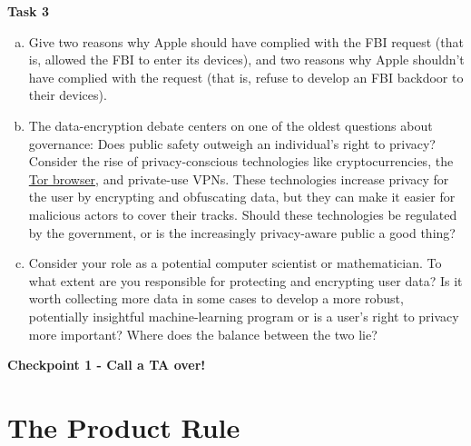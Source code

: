 \documentclass[12pt,letterpaper]{article}
\begin{document}
    \textbf{Task 3}
    \begin{enumerate}[a.]
    \item Give two reasons why Apple should have complied with the FBI request (that is, allowed the FBI to enter its devices), and two reasons why Apple shouldn't have complied with the request (that is, refuse to develop an FBI backdoor to their devices). 
    
    \begin{mdframed} \vspace{4cm} \end{mdframed}
    
    \item The data-encryption debate centers on one of the oldest questions about governance: Does public safety outweigh an individual's right to privacy? Consider the rise of privacy-conscious technologies like cryptocurrencies, the \href{https://medium.com/applied-cryptography/the-ethical-considerations-of-the-tor-browser-8bbc415720b6}{Tor browser}, and private-use VPNs. These technologies increase privacy for the user by encrypting and obfuscating data, but they can make it easier for malicious actors to cover their tracks. Should these technologies be regulated by the government, or is the increasingly privacy-aware public a good thing?
    
    \begin{mdframed} \vspace{4cm} \end{mdframed}
    
    \item Consider your role as a potential computer scientist or mathematician. To what extent are you responsible for protecting and encrypting user data? Is it worth collecting more data in some cases to develop a more robust, potentially insightful machine-learning program or is a user's right to privacy more important? Where does the balance between the two lie?
    
    \begin{mdframed} \vspace{4cm} \end{mdframed}
    \end{enumerate}

\textbf{Checkpoint 1 - Call a TA over!}

  \pagebreak
  
  \section*{The Product Rule}
  
\end{document}
